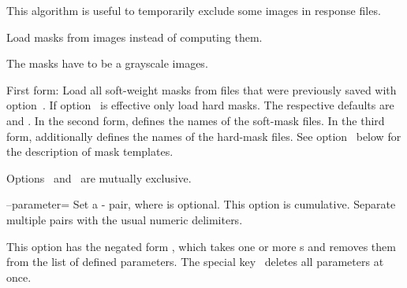 \begin{codelist}
\begin{codelist}
    This algorithm is useful to temporarily exclude some images in
    response files.
  \end{codelist}


\ifenfuse
  \label{opt:load-masks}%
  \item[\itempar{--load-masks~\textrm{(\oldstylefirst~form)}
      \\ --load-masks=\metavar{SOFT-MASK-TEMPLATE}~\textrm{(\oldstylesecond~form)}
      \\ --load-masks=\metavar{SOFT-MASK-TEMPLATE}:\feasiblebreak
      \metavar{HARD-MASK-TEMPLATE}~\textrm{(\oldstylethird~form)}}]\itemend
    Load  masks from images
    instead of computing them.

    The masks have to be a grayscale images.

    \begin{sloppypar}
      First form: Load all soft-weight masks from files that were
      previously saved with option~.  If
      option~ is effective only load hard masks.
      The respective defaults are
      \mbox{} and
      \mbox{}.  In the second form,
       defines the names of the
      soft-mask files.  In the third form,
       additionally defines the
      names of the hard-mask files.  See option~
      below for the description of mask templates.
    \end{sloppypar}

    Options~ and~ are
    mutually exclusive.
\fi


  \label{opt:parameter}%
\item[--parameter=\metavar{KEY}\optional{=\metavar{VALUE}}\optional{:\dots}]\itemend
  Set a - pair, where  is
  optional.  This option is cumulative.  Separate multiple pairs with
  the usual numeric delimiters.

  This option has the negated form
  ,
  which takes one or more s and removes them from the
  list of defined parameters.  The special key~\sample{*} deletes all
  parameters at once.


\end{codelist}

